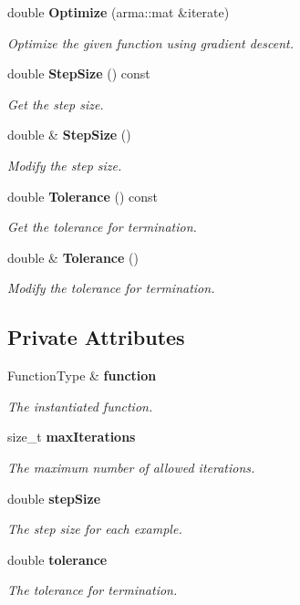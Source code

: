 \begin{DoxyCompactItemize}
double {\bf Optimize} (arma\+::mat \&iterate)
\begin{DoxyCompactList}\small\item\em Optimize the given function using gradient descent. \end{DoxyCompactList}\item 
double {\bf Step\+Size} () const 
\begin{DoxyCompactList}\small\item\em Get the step size. \end{DoxyCompactList}\item 
double \& {\bf Step\+Size} ()
\begin{DoxyCompactList}\small\item\em Modify the step size. \end{DoxyCompactList}\item 
double {\bf Tolerance} () const 
\begin{DoxyCompactList}\small\item\em Get the tolerance for termination. \end{DoxyCompactList}\item 
double \& {\bf Tolerance} ()
\begin{DoxyCompactList}\small\item\em Modify the tolerance for termination. \end{DoxyCompactList}\end{DoxyCompactItemize}
\subsection*{Private Attributes}
\begin{DoxyCompactItemize}
\item 
Function\+Type \& {\bf function}
\begin{DoxyCompactList}\small\item\em The instantiated function. \end{DoxyCompactList}\item 
size\+\_\+t {\bf max\+Iterations}
\begin{DoxyCompactList}\small\item\em The maximum number of allowed iterations. \end{DoxyCompactList}\item 
double {\bf step\+Size}
\begin{DoxyCompactList}\small\item\em The step size for each example. \end{DoxyCompactList}\item 
double {\bf tolerance}
\begin{DoxyCompactList}\small\item\em The tolerance for termination. \end{DoxyCompactList}\end{DoxyCompactItemize}


